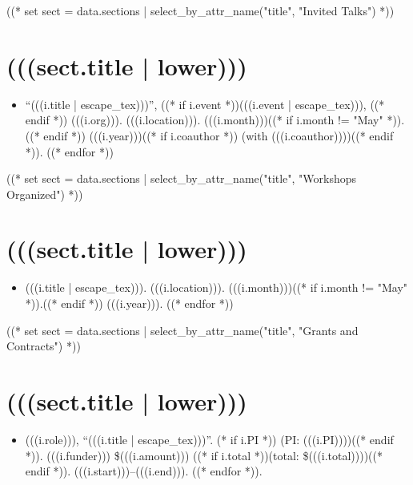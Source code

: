 \documentclass[11pt,article,oneside]{memoir}
\begin{document}
((* set sect = data.sections | select_by_attr_name("title", "Invited Talks") *))
\section{(((sect.title | lower)))}

\mbox{}\vspace{-\dimexpr\baselineskip\relax}

\begin{itemize}[label={}]
((* for i in sect.entries.talks | sort_by_attr(["year"], reverse=True) *))
\item \enquote{(((i.title | escape_tex)))}, ((* if i.event *))(((i.event | escape_tex))), ((* endif *)) (((i.org))). (((i.location))). (((i.month)))((* if i.month != "May" *)).((* endif *)) (((i.year)))((* if i.coauthor *)) (with (((i.coauthor))))((* endif *)).
((* endfor *))
\end{itemize}

((* set sect = data.sections | select_by_attr_name("title", "Workshops Organized") *))
\section{(((sect.title | lower)))}

\mbox{}\vspace{-\dimexpr\baselineskip\relax}

\begin{itemize}[label={}]
((* for i in sect.entries.workshops | sort_by_attr(["year"], reverse=True) *))
\item (((i.title | escape_tex))). (((i.location))). (((i.month)))((* if i.month != "May" *)).((* endif *)) (((i.year))).
((* endfor *))
\end{itemize}

((* set sect = data.sections | select_by_attr_name("title", "Grants and Contracts") *))
\section{(((sect.title | lower)))}

\mbox{}\vspace{-\dimexpr\baselineskip\relax}

\begin{itemize}[label={}]
((* for i in sect.entries.grants | sort_by_attr(["start"], reverse=True) *))
\item (((i.role))), \enquote{(((i.title | escape_tex)))}. (* if i.PI *)) (PI: (((i.PI))))((* endif *)). (((i.funder))) \$(((i.amount))) ((* if i.total *))(total: \$(((i.total))))((* endif *)). (((i.start)))--(((i.end))).
((* endfor *)).
\end{itemize}
\end{document}
